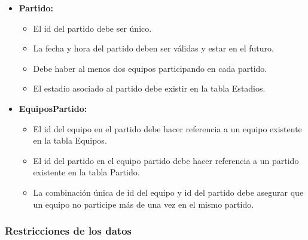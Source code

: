 \begin{itemize}
    \item \textbf{Partido:} 
    \begin{itemize}
        \item El id del partido debe ser único.
        \item La fecha y hora del partido deben ser válidas y estar en el futuro.
        \item Debe haber al menos dos equipos participando en cada partido.
        \item El estadio asociado al partido debe existir en la tabla Estadios.
    \end{itemize}
        
    \item \textbf{EquiposPartido:} 
    \begin{itemize}
        \item El id del equipo en el partido debe hacer referencia a un equipo existente en la tabla Equipos.
        \item El id del partido en el equipo partido debe hacer referencia a un partido existente en la tabla Partido.
        \item La combinación única de id del equipo y id del partido debe asegurar que un equipo no participe más de una vez en el mismo partido.
    \end{itemize}
\end{itemize}

\subsubsection*{Restricciones de los datos}

